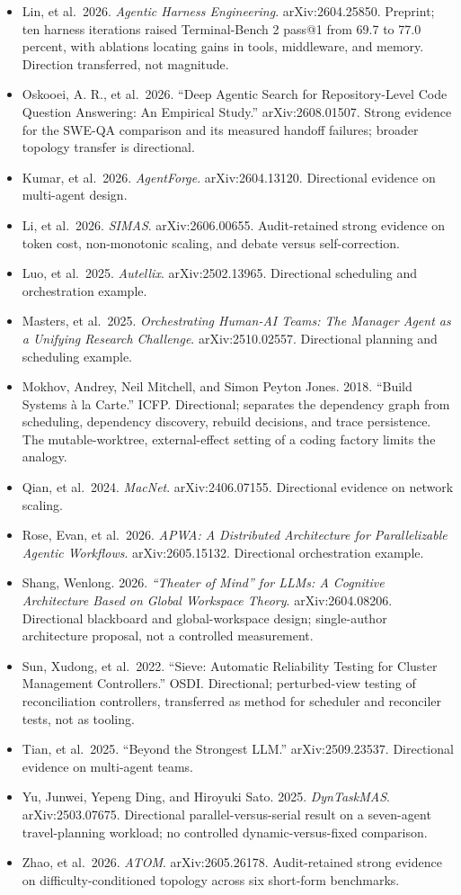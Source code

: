 \begin{itemize}
\item
  Lin, et al.~2026. \emph{Agentic Harness Engineering}. arXiv:2604.25850. Preprint; ten harness iterations raised Terminal-Bench 2 pass@1 from 69.7 to 77.0 percent, with ablations locating gains in tools, middleware, and memory. Direction transferred, not magnitude.
\item
  Oskooei, A. R., et al.~2026. ``Deep Agentic Search for Repository-Level Code Question Answering: An Empirical Study.'' arXiv:2608.01507. Strong evidence for the SWE-QA comparison and its measured handoff failures; broader topology transfer is directional.
\item
  Kumar, et al.~2026. \emph{AgentForge}. arXiv:2604.13120. Directional evidence on multi-agent design.
\item
  Li, et al.~2026. \emph{SIMAS}. arXiv:2606.00655. Audit-retained strong evidence on token cost, non-monotonic scaling, and debate versus self-correction.
\item
  Luo, et al.~2025. \emph{Autellix}. arXiv:2502.13965. Directional scheduling and orchestration example.
\item
  Masters, et al.~2025. \emph{Orchestrating Human-AI Teams: The Manager Agent as a Unifying Research Challenge}. arXiv:2510.02557. Directional planning and scheduling example.
\item
  Mokhov, Andrey, Neil Mitchell, and Simon Peyton Jones. 2018. ``Build Systems à la Carte.'' ICFP. Directional; separates the dependency graph from scheduling, dependency discovery, rebuild decisions, and trace persistence. The mutable-worktree, external-effect setting of a coding factory limits the analogy.
\item
  Qian, et al.~2024. \emph{MacNet}. arXiv:2406.07155. Directional evidence on network scaling.
\item
  Rose, Evan, et al.~2026. \emph{APWA: A Distributed Architecture for Parallelizable Agentic Workflows}. arXiv:2605.15132. Directional orchestration example.
\item
  Shang, Wenlong. 2026. \emph{``Theater of Mind'' for LLMs: A Cognitive Architecture Based on Global Workspace Theory}. arXiv:2604.08206. Directional blackboard and global-workspace design; single-author architecture proposal, not a controlled measurement.
\item
  Sun, Xudong, et al.~2022. ``Sieve: Automatic Reliability Testing for Cluster Management Controllers.'' OSDI. Directional; perturbed-view testing of reconciliation controllers, transferred as method for scheduler and reconciler tests, not as tooling.
\item
  Tian, et al.~2025. ``Beyond the Strongest LLM.'' arXiv:2509.23537. Directional evidence on multi-agent teams.
\item
  Yu, Junwei, Yepeng Ding, and Hiroyuki Sato. 2025. \emph{DynTaskMAS}. arXiv:2503.07675. Directional parallel-versus-serial result on a seven-agent travel-planning workload; no controlled dynamic-versus-fixed comparison.
\item
  Zhao, et al.~2026. \emph{ATOM}. arXiv:2605.26178. Audit-retained strong evidence on difficulty-conditioned topology across six short-form benchmarks.
\end{itemize}

